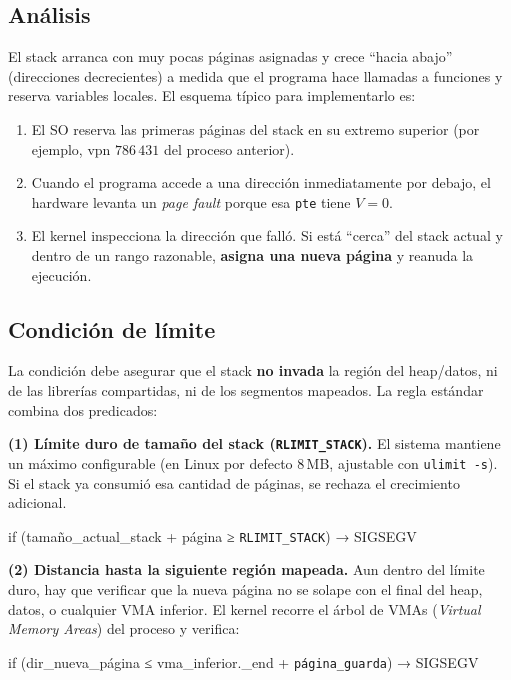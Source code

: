 \documentclass[11pt,a4paper]{article}
\begin{document}
\subsection{Análisis}

El stack arranca con muy pocas páginas asignadas y crece ``hacia
abajo'' (direcciones decrecientes) a medida que el programa hace
llamadas a funciones y reserva variables locales. El esquema típico
para implementarlo es:

\begin{enumerate}[leftmargin=*,nosep]
    \item El SO reserva las primeras páginas del stack en su extremo
        superior (por ejemplo, vpn $786\,431$ del proceso anterior).
    \item Cuando el programa accede a una dirección inmediatamente por
        debajo, el hardware levanta un \emph{page fault} porque esa
        \texttt{pte} tiene $V=0$.
    \item El kernel inspecciona la dirección que falló. Si está
        ``cerca'' del stack actual y dentro de un rango razonable,
        \textbf{asigna una nueva página} y reanuda la ejecución.
\end{enumerate}

\subsection{Condición de límite}

La condición debe asegurar que el stack \textbf{no invada} la región
del heap/datos, ni de las librerías compartidas, ni de los segmentos
mapeados. La regla estándar combina dos predicados:

\textbf{(1) Límite duro de tamaño del stack (\texttt{RLIMIT\_STACK}).}
El sistema mantiene un máximo configurable (en Linux por defecto
$8$\,MB, ajustable con \texttt{ulimit -s}). Si el stack ya consumió
esa cantidad de páginas, se rechaza el crecimiento adicional.

\quad if (tamaño\_actual\_stack + página ≥ \texttt{RLIMIT\_STACK}) → SIGSEGV

\textbf{(2) Distancia hasta la siguiente región mapeada.} Aun dentro
del límite duro, hay que verificar que la nueva página no se solape
con el final del heap, datos, o cualquier VMA inferior. El kernel
recorre el árbol de VMAs (\emph{Virtual Memory Areas}) del proceso y
verifica:

\quad if (dir\_nueva\_página ≤ vma\_inferior.\_end + \texttt{página\_guarda}) → SIGSEGV
\end{document}

